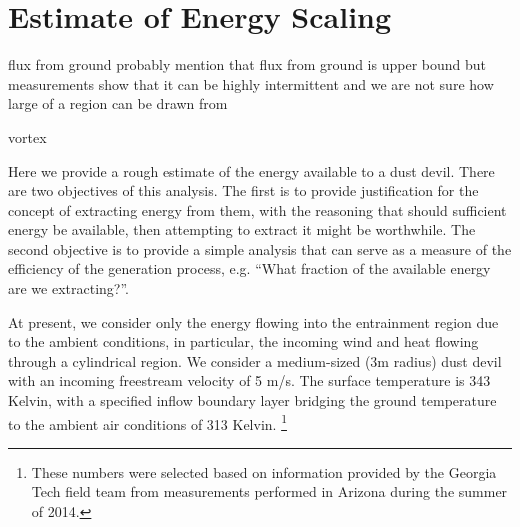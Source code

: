 \section{Estimate of Energy Scaling}

flux from ground
probably mention that flux from ground is upper bound but 
measurements show that it can be highly intermittent and we are 
not sure how large of a region can be drawn from

vortex

%
%

Here we provide a rough estimate of the energy
available to a dust devil. There are two objectives of this
analysis. The first is to provide justification for the concept of
extracting energy from them, with the reasoning that should
sufficient energy be available, then attempting to extract it might be
worthwhile. The second objective is to provide a simple analysis that
can serve as a measure of the efficiency of the generation process,
e.g. ``What fraction of the available energy are we extracting?''.  

At present, we consider only the energy flowing into the entrainment
region due to the ambient conditions, in particular, the incoming wind
and heat flowing through a cylindrical region. We
consider a medium-sized (3m radius) dust devil with an incoming
freestream velocity of 5 m/s. The surface temperature is 343 Kelvin,
with a specified inflow boundary layer bridging the ground temperature
to the ambient air conditions of 313 Kelvin. 
\footnote{\normalsize These numbers were selected based on information
provided by the Georgia Tech field team from measurements performed in
Arizona during the summer of 2014.} 

